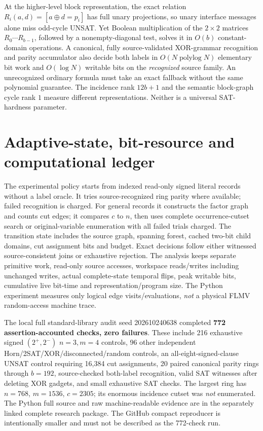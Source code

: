 \documentclass[11pt]{article}
\begin{document}
At the higher-level block representation, the exact relation $R_i(a,d)=[a\oplus d=p_i]$ has full unary projections, so unary interface messages alone miss odd-cycle UNSAT. Yet Boolean multiplication of the $2\times2$ matrices $R_0\cdots R_{b-1}$, followed by a nonempty-diagonal test, solves it in $O(b)$ constant-domain operations. A canonical, fully source-validated XOR-grammar recognition and parity accumulator also decide both labels in $O(N\operatorname{polylog}N)$ elementary bit work and $O(\log N)$ writable bits on the \emph{recognized} source family. An unrecognized ordinary formula must take an exact fallback without the same polynomial guarantee. The incidence rank $12b+1$ and the semantic block-graph cycle rank $1$ measure different representations. Neither is a universal SAT-hardness parameter.

\section{Adaptive-state, bit-resource and computational ledger}
The experimental policy starts from indexed read-only signed literal records without a label oracle. It tries source-recognized ring parity where available; failed recognition is charged. For general records it constructs the factor graph and counts cut edges; it compares $c$ to $n$, then uses complete occurrence-cutset search or original-variable enumeration with all failed trials charged. The transition state includes the source graph, spanning forest, cached two-bit child domains, cut assignment bits and budget. Exact decisions follow either witnessed source-consistent joins or exhaustive rejection. The analysis keeps separate primitive work, read-only source accesses, workspace reads/writes including unchanged writes, actual complete-state temporal flips, peak writable bits, cumulative live bit-time and representation/program size. The Python experiment measures only logical edge visits/evaluations, \emph{not} a physical FLMV random-access machine trace.

The local full standard-library audit seed 202610240638 completed \textbf{772 assertion-accounted checks, zero failures}. These include 216 exhaustive signed $(2^+,2^-)$ $n=3,m=4$ controls, 96 other independent Horn/2SAT/XOR/disconnected/random controls, an all-eight-signed-clause UNSAT control requiring 16,384 cut assignments, 20 paired canonical parity rings through $b=192$, source-checked both-label recognition, valid SAT witnesses after deleting XOR gadgets, and small exhaustive SAT checks. The largest ring has $n=768$, $m=1536$, $c=2305$; its enormous incidence cutset was \emph{not} enumerated. The Python full source and raw machine-readable evidence are in the separately linked complete research package. The GitHub compact reproducer is intentionally smaller and must not be described as the 772-check run.
\end{document}
